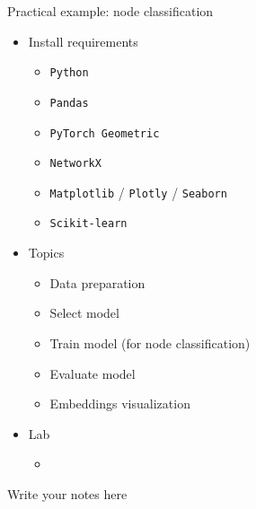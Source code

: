 \documentclass[aspectratio=169]{beamer}
\begin{document}
        \begin{frame}{Practical example: node classification}
            \begin{itemize}
                \item Install requirements
                    \begin{itemize}
                        \item \texttt{Python}
                        \item \texttt{Pandas} 
                        \item \texttt{PyTorch Geometric}
                        \item \texttt{NetworkX}
                        \item \texttt{Matplotlib} / \texttt{Plotly} / \texttt{Seaborn}
                        \item \texttt{Scikit-learn}
                    \end{itemize}
                \item Topics 
                    \begin{itemize}
                        \item Data preparation
                        \item Select model
                        \item Train model (for node classification)
                        \item Evaluate model
                        \item Embeddings visualization
                    \end{itemize}
                \item Lab
                    \begin{itemize}
                        \item \href{https://drive.google.com/file/d/12Ek4FL7PbQWjZnOkfpV4Mj30LafmrAkr/view?usp=sharing}{
                            }
                    \end{itemize}
            \end{itemize}
            
            \begin{note}
                {Write your notes here}
            \end{note}
        \end{frame}
\end{document}
